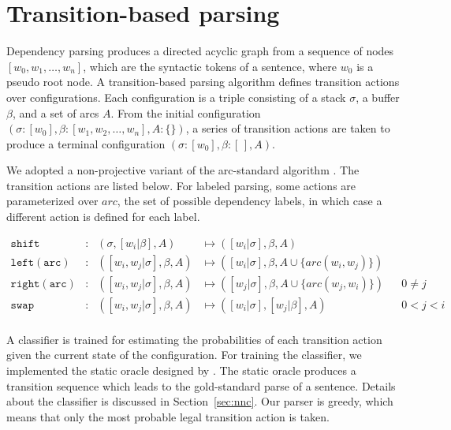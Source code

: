 \documentclass[11pt]{article}
\begin{document}
\section{Transition-based parsing}
\label{sec:pars}

Dependency parsing produces a directed acyclic graph from a sequence of nodes \([w_{0}, w_{1}, \ldots, w_{n}]\),
which are the syntactic tokens of a sentence,
where \(w_{0}\) is a pseudo root node.
A transition-based parsing algorithm defines transition actions over configurations.
Each configuration is a triple consisting of a stack \(\sigma\), a buffer \(\beta\), and a set of arcs \(A\).
From the initial configuration \((\sigma \colon [w_{0}], \beta \colon [w_{1}, w_{2}, \ldots, w_{n}], A \colon \{\})\),
a series of transition actions are taken to produce a terminal configuration \((\sigma \colon [w_{0}], \beta \colon [\,], A)\).

We adopted a non-projective variant of the arc-standard algorithm \parencite{nivre2008algorithms, nivre2009non}.
The transition actions are listed below.
For labeled parsing, some actions are parameterized over \(arc\), the set of possible dependency labels,
in which case a different action is defined for each label.

\begin{align*}
  \mathtt{shift} &:& (\sigma, [w_{i} \vert \beta], A) &\mapsto ([w_{i} \vert \sigma], \beta, A)& &\\
  \mathtt{left(arc)} &:& ([w_{i}, w_{j} \vert \sigma], \beta, A) &\mapsto ([w_{i} \vert \sigma], \beta, A \cup \{arc(w_{i}, w_{j})\})& &\\
  \mathtt{right(arc)} &:& ([w_{i}, w_{j} \vert \sigma], \beta, A) &\mapsto ([w_{j} \vert \sigma], \beta, A \cup \{arc(w_{j}, w_{i})\})& &0 \neq j\\
  \mathtt{swap} &:& ([w_{i}, w_{j} \vert \sigma], \beta, A) &\mapsto ([w_{i} \vert \sigma], [w_{j} \vert \beta], A)& &0 < j < i\\
\end{align*}

A classifier is trained for estimating the probabilities of each transition action given the current state of the configuration.
For training the classifier, we implemented the static oracle designed by \textcite{nivre2009improved}.
The static oracle produces a transition sequence which leads to the gold-standard parse of a sentence.
Details about the classifier is discussed in Section~\ref{sec:nnc}.
Our parser is greedy, which means that only the most probable legal transition action is taken.
\end{document}
